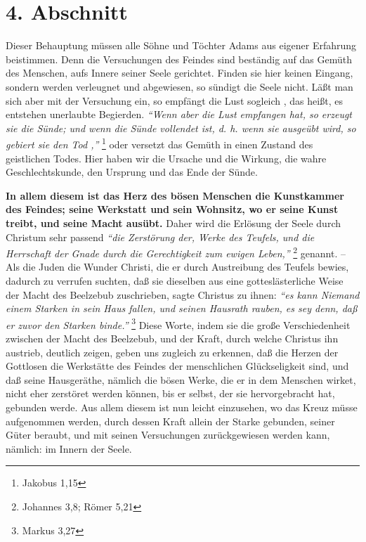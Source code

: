 \section{4. Abschnitt} \label{kap3_ab4} 

Dieser Behauptung müssen alle Söhne und Töchter Adams aus eigener Erfahrung
beistimmen. Denn die Versuchungen des Feindes sind beständig auf das Gemüth des
Menschen, aufs Innere seiner Seele gerichtet. Finden sie hier keinen Eingang,
sondern werden verleugnet und abgewiesen, so sündigt die Seele nicht. Läßt man
sich aber mit der Versuchung ein, so empfängt die Lust sogleich , das heißt, es
entstehen unerlaubte Begierden.
\textit{"`Wenn aber die Lust empfangen hat, so erzeugt
sie die Sünde; und wenn die Sünde vollendet ist, d. h. wenn sie ausgeübt wird,
so gebiert sie den Tod ,"'}
\footnote{Jakobus 1,15}
oder versetzt das Gemüth in einen
Zustand des geistlichen Todes. Hier haben wir die
Ursache und die Wirkung, die
wahre Geschlechtskunde, den Ursprung und das Ende der Sünde.

\medskip

\textbf{In allem diesem ist das Herz des bösen Menschen die Kunstkammer des
Feindes; seine Werkstatt und sein Wohnsitz, wo er seine Kunst treibt, und seine
Macht ausübt.} Daher wird die Erlösung der Seele durch Christum sehr passend
\textit{"`die Zerstörung der, Werke des Teufels, und die Herrschaft der Gnade
durch die Gerechtigkeit zum ewigen Leben,"'}
\footnote{Johannes 3,8; Römer 5,21}
genannt. -- Als
die Juden die Wunder Christi, die er durch Austreibung des Teufels bewies,
dadurch zu verrufen suchten, daß sie dieselben aus eine gotteslästerliche Weise
der Macht des Beelzebub zuschrieben, sagte Christus zu ihnen:
\textit{"`es kann Niemand einem Starken in sein Haus fallen, und seinen
Hausrath rauben, es sey denn, daß er zuvor den Starken binde."'}
\footnote{Markus 3,27}
Diese Worte, indem sie die
große Verschiedenheit zwischen der Macht des Beelzebub, und der Kraft, durch
welche Christus ihn austrieb, deutlich zeigen, geben uns zugleich zu erkennen,
daß die Herzen der Gottlosen die Werkstätte des Feindes der menschlichen
Glückseligkeit sind, und daß seine Hausgeräthe, nämlich die bösen Werke, die er
in dem Menschen wirket, nicht eher zerstöret werden können, bis er selbst, der
sie hervorgebracht hat, gebunden werde. Aus allem diesem ist nun leicht
einzusehen, wo das Kreuz müsse aufgenommen werden, durch dessen Kraft allein der
Starke gebunden, seiner Güter beraubt, und mit seinen Versuchungen
zurückgewiesen werden kann, nämlich: im Innern der Seele.

